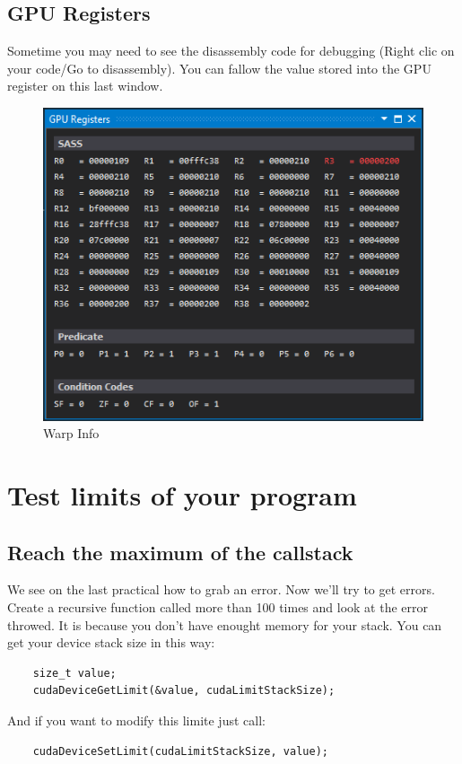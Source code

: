 \documentclass{article}
\begin{document}
\newpage
\subsection{GPU Registers}
Sometime you may need to see the disassembly code for debugging (Right clic on your code/Go to disassembly). You can fallow the value stored into the GPU register on this last window.

\begin{figure}[h]
	\centering
	\includegraphics[scale=0.6]{figures/register.png}
	\caption{Warp Info}
\end{figure}

\newpage
\section{Test limits of your program}
\subsection{Reach the maximum of the callstack}
We see on the last practical how to grab an error. Now we'll try to get errors. Create a recursive function called more than 100 times and look at the error throwed. It is because you don't have enought memory for your stack. You can get your device stack size in this way:
\begin{lstlisting}
	size_t value;
	cudaDeviceGetLimit(&value, cudaLimitStackSize);
\end{lstlisting}
And if you want to modify this limite just call:
\begin{lstlisting}
	cudaDeviceSetLimit(cudaLimitStackSize, value);
\end{lstlisting}
\end{document}

